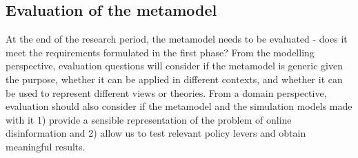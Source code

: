 \subsection{Evaluation of the metamodel}
At the end of the research period, the metamodel needs to be evaluated - does it meet the requirements formulated in the first phase? From the modelling perspective, evaluation questions will consider if the metamodel is generic given the purpose, whether it can be applied in different contexts, and whether it can be used to represent different views or theories. From a domain perspective, evaluation should also consider if the metamodel and the simulation models made with it 1) provide a sensible representation of the problem of online disinformation and 2) allow us to test relevant policy levers and obtain meaningful results.
 
